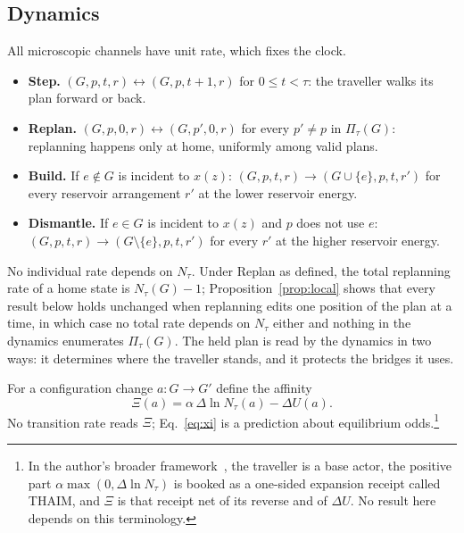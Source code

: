 \documentclass[aps,pre,preprint,superscriptaddress,nofootinbib]{revtex4-2}
\theoremstyle{definition}
\theoremstyle{remark}
\newcommand{\N}{N_\tau}
\newcommand{\Pl}{\Pi_\tau}
\begin{document}
\subsection{Dynamics}

All microscopic channels have unit rate, which fixes the clock.
\begin{itemize}
\item \textbf{Step.} $(G,p,t,r)\leftrightarrow(G,p,t+1,r)$ for $0\le t<\tau$: the traveller walks its plan forward or back.
\item \textbf{Replan.} $(G,p,0,r)\leftrightarrow(G,p',0,r)$ for every $p'\ne p$ in $\Pl(G)$: replanning happens only at home, uniformly among valid plans.
\item \textbf{Build.} If $e\notin G$ is incident to $x(z)$: $(G,p,t,r)\to(G\cup\{e\},p,t,r')$ for every reservoir arrangement $r'$ at the lower reservoir energy.
\item \textbf{Dismantle.} If $e\in G$ is incident to $x(z)$ and $p$ does not use $e$: $(G,p,t,r)\to(G\setminus\{e\},p,t,r')$ for every $r'$ at the higher reservoir energy.
\end{itemize}
No individual rate depends on $\N$. Under Replan as defined, the total replanning rate of a home state is $\N(G)-1$; Proposition~\ref{prop:local} shows that every result below holds unchanged when replanning edits one position of the plan at a time, in which case no total rate depends on $\N$ either and nothing in the dynamics enumerates $\Pl(G)$. The held plan is read by the dynamics in two ways: it determines where the traveller stands, and it protects the bridges it uses.

For a configuration change $a:G\to G'$ define the affinity
\begin{equation}
  \Xi(a)=\alpha\,\Delta\ln\N(a)-\Delta U(a).
  \label{eq:xi}
\end{equation}
No transition rate reads $\Xi$; Eq.~\eqref{eq:xi} is a prediction about equilibrium odds.\footnote{In the author's broader framework~\cite{CALXTHERM}, the traveller is a base actor, the positive part $\alpha\max(0,\Delta\ln\N)$ is booked as a one-sided expansion receipt called THAIM, and $\Xi$ is that receipt net of its reverse and of $\Delta U$. No result here depends on this terminology.}
\end{document}
